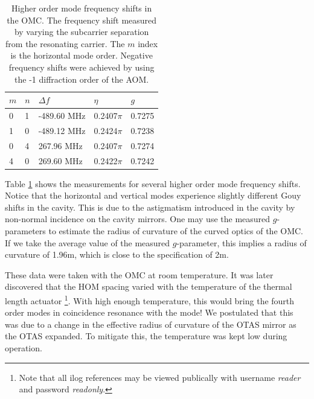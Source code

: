 \begin{table}
  \begin{center}
    \begin{tabular}{lll|ll}
      \hline
      $m$ & $n$ & $\Delta f$ & $\eta$ & $g$ \\
      \hline
      0 & 1 & -489.60 MHz & 0.2407$\pi$ & 0.7275\\
      1 & 0 & -489.12 MHz & 0.2424$\pi$ & 0.7238\\
      0 & 4 &  267.96 MHz & 0.2407$\pi$ & 0.7274\\
      4 & 0 &  269.60 MHz & 0.2422$\pi$ & 0.7242\\
      \hline
    \end{tabular}
  \caption[Higher order mode frequency shifts in the OMC]{Higher order mode frequency shifts in the OMC. The frequency shift measured by varying the subcarrier separation from the resonating carrier. The $m$ index is the horizontal mode order. Negative frequency shifts were achieved by using the -1 diffraction order of the AOM.}
  \label{tab:HOM}
  \end{center}
\end{table}

Table \ref{tab:HOM} shows the measurements for several higher order mode frequency shifts. %
Notice that the horizontal and vertical modes experience slightly different Gouy shifts in the cavity. %
This is due to the astigmatism introduced in the cavity by non-normal incidence on the cavity mirrors. %
One may use the measured $g$-parameters to estimate the radius of curvature of the curved optics of the OMC. %
If we take the average value of the measured $g$-parameter, this implies a radius of curvature of 1.96m, which is close to the specification of 2m.

These data were taken with the OMC at room temperature. %
It was later discovered that the HOM spacing varied with the temperature of the thermal length actuator \cite{OTASmodes}\footnote{Note that all ilog references may be viewed publically with username {\it reader} and password {\it readonly}.}. %
With high enough temperature, this would bring the fourth order modes in coincidence resonance with the  mode! %
We postulated that this was due to a change in the effective radius of curvature of the OTAS mirror as the OTAS expanded. %
To mitigate this, the temperature was kept low during operation.

